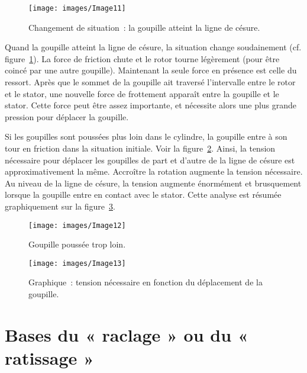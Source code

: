 \documentclass[a4paper,french,11pt,twoside]{report}
\begin{document}
\begin{figure}[ht]
  \begin{center}
    \texttt{[image: images/Image11]}
    \caption{Changement de situation~: la goupille atteint la ligne de césure.\label{goupille_ligne_cesure}}
  \end{center}
\end{figure}

Quand la goupille atteint la ligne de césure, la situation change soudainement (cf. figure~\ref{goupille_ligne_cesure}). La force de friction chute et le rotor tourne légèrement (pour être coincé par une autre goupille). Maintenant la seule force en présence est celle du ressort. Après que le sommet de la goupille ait traversé l'intervalle entre le rotor et le stator, une nouvelle force de frottement apparaît entre la goupille et le stator. Cette force peut être assez importante, et nécessite alors une plus grande pression pour déplacer la goupille.

Si les goupilles sont poussées plus loin dans le cylindre, la goupille entre à son tour en friction dans la situation initiale. Voir la figure~\ref{goupille_trop_loin}. Ainsi, la tension nécessaire pour déplacer les goupilles de part et d'autre de la ligne de césure est approximativement la même. Accroître la rotation augmente la tension nécessaire. Au niveau de la ligne de césure, la tension augmente énormément et brusquement lorsque la goupille entre en contact avec le stator. Cette analyse est résumée graphiquement sur la figure~\ref{graphique_tension_deplacement}.

\begin{figure}[ht]
  \begin{center}
    \texttt{[image: images/Image12]}
    \caption{Goupille poussée trop loin.\label{goupille_trop_loin}}
  \end{center}
\end{figure}

\begin{figure}[ht]
  \begin{center}
    \texttt{[image: images/Image13]}
    \caption{Graphique~: tension nécessaire en fonction du déplacement de la goupille.\label{graphique_tension_deplacement}}
  \end{center}
\end{figure}


\chapter{\label{chap:raclage_ratissage}Bases du « raclage » ou du « ratissage »}
\end{document}
